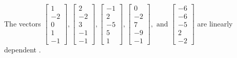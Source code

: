 \begin{exercise}
\begin{exerciseStatement}
  \end{exerciseStatement}
  \begin{exerciseAnswer}
   The vectors \(\left[\begin{array}{r}
1 \\
-2 \\
0 \\
1 \\
-1
\end{array}\right] , \left[\begin{array}{r}
2 \\
-2 \\
3 \\
-1 \\
-1
\end{array}\right] , \left[\begin{array}{r}
-1 \\
2 \\
-5 \\
5 \\
1
\end{array}\right] , \left[\begin{array}{r}
0 \\
-2 \\
7 \\
-9 \\
-1
\end{array}\right] , \text{ and } \left[\begin{array}{r}
-6 \\
-6 \\
-5 \\
2 \\
-2
\end{array}\right]\) are 
  	 linearly dependent  .
  


  \end{exerciseAnswer}
\end{exercise}